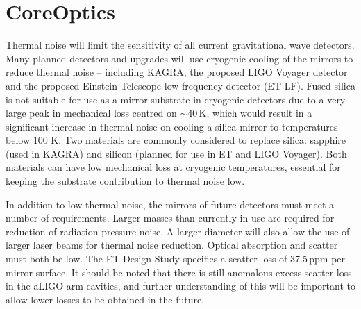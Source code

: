 \chapter{CoreOptics}
\label{sec:Core_optics}
Thermal noise will limit the sensitivity of all current gravitational wave detectors. Many planned detectors and upgrades will use cryogenic cooling of the mirrors to reduce thermal noise -- including KAGRA, the proposed LIGO Voyager detector and the proposed Einstein Telescope low-frequency detector (ET-LF). Fused silica is not suitable for use as a mirror substrate in cryogenic detectors due to a very large peak in mechanical loss centred on $\sim$40\,K, which would result in a significant increase in thermal noise on cooling a silica mirror to temperatures below 100 K.  Two materials are commonly considered to replace silica: sapphire (used in KAGRA) and silicon (planned for use in ET and LIGO Voyager). Both materials can have low mechanical loss at cryogenic temperatures, essential for keeping the substrate contribution to thermal noise low. 

In addition to low thermal noise, the mirrors of future detectors must meet a number of requirements. Larger masses than currently in use are required for reduction of radiation pressure noise. A larger diameter will also allow the use of larger laser beams for thermal noise reduction. Optical absorption and scatter must both be low. The ET Design Study specifies a scatter loss of 37.5\,ppm per mirror surface. It should be noted that there is still anomalous excess scatter loss in the aLIGO arm cavities, and further understanding of this will be important to allow lower losses to be obtained in the future. 


